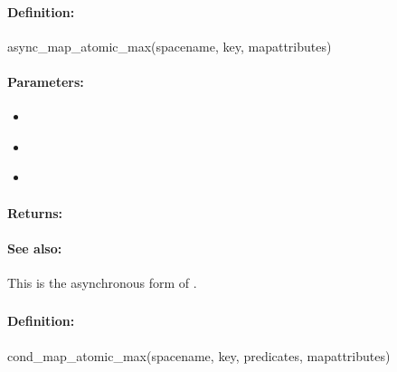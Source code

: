 \paragraph{Definition:}
\begin{rubycode}
async_map_atomic_max(spacename, key, mapattributes)
\end{rubycode}

\paragraph{Parameters:}
\begin{itemize}[noitemsep]
\item {}\\

\item {}\\

\item {}\\

\end{itemize}

\paragraph{Returns:}


\paragraph{See also:}  This is the asynchronous form of .

\pagebreak
\subsubsection{}
\label{api:ruby:cond_map_atomic_max}


\paragraph{Definition:}
\begin{rubycode}
cond_map_atomic_max(spacename, key, predicates, mapattributes)
\end{rubycode}


